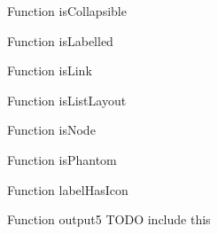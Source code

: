 \begin{minipage}[b]{0.5\textwidth}
\centering
{}
Function isCollapsible
\end{minipage}
\begin{minipage}[b]{0.5\textwidth}
\centering
{}
Function isLabelled
\end{minipage}
\begin{minipage}[b]{0.5\textwidth}
\centering
{}
Function isLink
\end{minipage}
\begin{minipage}[b]{0.5\textwidth}
\centering
{}
Function isListLayout
\end{minipage}
\begin{minipage}[b]{0.5\textwidth}
\centering
{}
Function isNode
\end{minipage}
\begin{minipage}[b]{0.5\textwidth}
\centering
{}
Function isPhantom
\end{minipage}
\begin{minipage}[b]{0.5\textwidth}
\centering
{}
Function labelHasIcon
\end{minipage}
\begin{minipage}[b]{0.5\textwidth}
\centering
Function output5
TODO include this
\end{minipage}